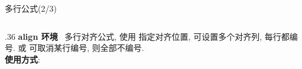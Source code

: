 \begin{frame}{多行公式(2/3)}
	\begin{columns}[onlytextwidth]
		\begin{column}{.36\columnwidth}
			\alert{\bfseries align 环境}~
			多行对齐公式, 使用 \fverb{\&} 指定对齐位置, 可设置多个对齐列, 每行都编号.  或  可取消某行编号,  则全部不编号.\\[1ex]
			\textbf{使用方式}:\\[.5ex]
			\\
			\hspace*{1em} \fverb{\&} \cmd{\textbackslash}\\
			\hspace*{1em} \fverb{\&} \cmd{\textbackslash} \\
			\\[2ex]


\end{column}
\end{columns}
\end{frame}
